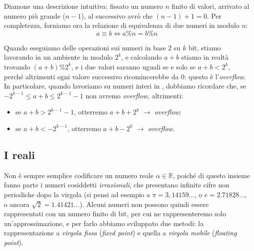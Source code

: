 \documentclass[class=book, crop=false, oneside]{standalone}
\begin{document}
Diamone una descrizione intuitiva: fissato un numero \(n\) finito di valori, arrivato al numero più grande (\(n-1\)), al successivo avrò che \((n-1)+1=0\). Per completezza, forniamo ora la relazione di equivalenza di due numeri in modulo \(n\):
\begin{equation*}
	a\equiv b \Longleftrightarrow a\%n=b\%n
\end{equation*}

Quando eseguiamo delle operazioni sui numeri in base 2 su \(k\) bit, stiamo lavorando in un ambiente in modulo \(2^{k}\), e calcolando \(a+b\) stiamo in realtà trovando \((a+b)\%2^{k}\), e i due valori saranno uguali se e solo se \(a+b<2^{k}\), perché altrimenti ogni valore successivo ricomincerebbe da 0: questo è l'\emph{overflow}. In particolare, quando lavoriamo su numeri interi in , dobbiamo ricordare che, se \(-2^{k-1}\le a+b\le 2^{k-1}-1\) non avremo \emph{overflow}, altrimenti:
\begin{itemize}
	\item se \(a+b>2^{k-1}-1\), otterremo \(a+b+2^{k}\) \(\longrightarrow\) \emph{overflow};
	\item se \(a+b<-2^{k-1}\), otterremo \(a+b-2^{k}\) \(\longrightarrow\) \emph{overflow}.
\end{itemize}

\subsection{I reali}
Non è sempre semplice codificare un numero reale \(\alpha \in \mathbb{R}\), poiché di questo insieme fanno parte i numeri cosiddetti \emph{irrazionali}, che presentano infinite cifre non periodiche dopo la virgola (si pensi ad esempio a \(\pi=3,14159...\), o \(e=2.71828...\), o ancora \(\sqrt{2}=1.41421...\)). Alcuni numeri non possono quindi essere rappresentati con un numero finito di bit, per cui ne rappresenteremo solo un'approssimazione, e per farlo abbiamo sviluppato due metodi: la rappresentazione a \emph{virgola fissa} (\emph{fixed point}) e quella a \emph{virgola mobile} (\emph{floating point}).
\end{document}
